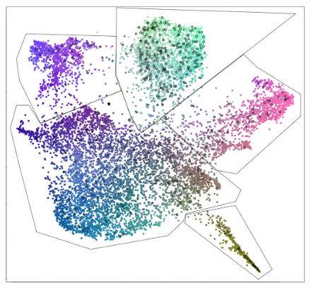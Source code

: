 \documentclass[
11pt, %
oneside, %
english, %
doublespacing, %
headsepline, %
]{MastersDoctoralThesis} %
\begin{document}

\appendix %

\begin{figure}
\includegraphics[width=\hsize,keepaspectratio]{./Figures/5Clusters.png}
\label{Cluster}
\end{figure}


%



\printbibliography[heading=bibintoc]

\end{document}
